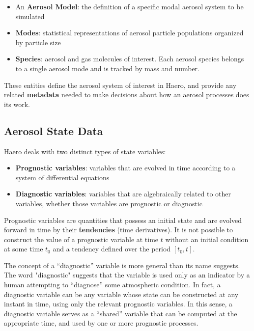 \begin{itemize}
  \item An {\bf Aerosol Model}: the definition of a specific modal aerosol
        system to be simulated
  \item {\bf Modes}: statistical representations of aerosol particle populations
        organized by particle size
  \item {\bf Species}: aerosol and gas molecules of interest. Each aerosol
        species belongs to a single aerosol mode and is tracked by mass and
        number.
\end{itemize}

These entities define the aerosol system of interest in Haero, and provide
any related {\bf metadata} needed to make decisions about how an aerosol
processes does its work.

\subsection{Aerosol State Data}

Haero deals with two distinct types of state variables:

\begin{itemize}
  \item {\bf Prognostic variables}: variables that are evolved in time according
        to a system of differential equations
  \item {\bf Diagnostic variables}: variables that are algebraically related to
        other variables, whether those variables are prognostic or diagnostic
\end{itemize}

Prognostic variables are quantities that possess an initial state and are
evolved forward in time by their {\bf tendencies} (time derivatives). It is
not possible to construct the value of a prognostic variable at time $t$ without
an initial condition at some time $t_0$ and a tendency defined over the period
$\left[t_0, t\right]$.

The concept of a ``diagnostic'' variable is more general than its name suggests.
The word "diagnostic" suggests that the variable is used only as an indicator
by a human attempting to ``diagnose'' some atmospheric condition. In fact, a
diagnostic variable can be any variable whose state can be constructed at any
instant in time, using only the relevant prognostic variables. In this sense,
a diagnostic variable serves as a ``shared'' variable that can be computed at
the appropriate time, and used by one or more prognostic processes.


